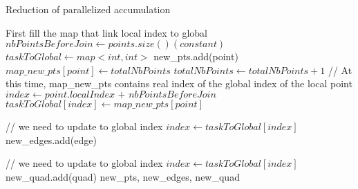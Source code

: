 \documentclass{article}
\begin{document}
\begin{algorithm}
\caption{Reduction of parallelized accumulation}
\begin{algorithmic}

\STATE First fill the map that link local index to global
\STATE $nbPointsBeforeJoin \leftarrow points.size() (constant)$
	\STATE $taskToGlobal \leftarrow map<int, int>$ 
			\STATE new\_pts.add(point)
			\STATE $map\_new\_pts[point] \leftarrow totalNbPoints$
			\STATE $totalNbPoints \leftarrow totalNbPoints + 1$
		\ENDIF
		\STATE // At this time, map\_new\_pts contains real index of the global index of the local point
		\STATE $index \leftarrow point.localIndex \texttt{ + } nbPointsBeforeJoin$
		\STATE $taskToGlobal[index]\leftarrow map\_new\_pts[point]$
	\ENDFOR

    \STATE
				\STATE // we need to update to global index
				\STATE $index \leftarrow taskToGlobal[index]$
			\ENDIF
			\ENDFOR
		\STATE new\_edges.add(edge)
        
    \STATE

				\STATE // we need to update to global index
				\STATE $index \leftarrow taskToGlobal[index]$
			\ENDIF
		\ENDFOR
		\STATE new\_quad.add(quad)
\STATE
\ENDFOR
\RETURN new\_pts, new\_edges, new\_quad

\end{algorithmic}
\end{algorithm}
\end{document}
